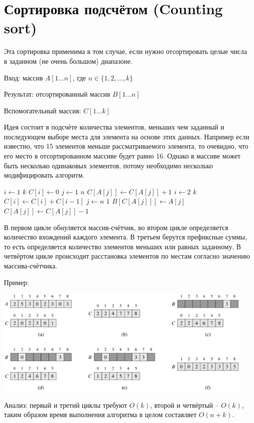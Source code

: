 \documentclass[a4paper,11pt]{article}
\begin{document}
\section{Сортировка подсчётом (Counting sort)}
Эта сортировка применима в том случае, если нужно отсортировать целые числа в
заданном (не очень большом) диапазоне.

Вход: массив $A[1 \ldots n]$, где $n \in \lbrace 1, 2, \ldots, k \rbrace$

Результат: отсортированный массив $B[1 \ldots n]$

Вспомогательный массив: $C[1 \ldots k]$

Идея состоит в подсчёте количества элементов, меньших чем заданный и последующем
выборе места для элемента на основе этих данных. Например если известно, что 15
элементов меньше рассматриваемого элемента, то очевидно, что его место в
отсортированном массиве будет равно 16. Однако в массиве может быть несколько
одинаковых элементов, потому необходимо несколько модифицировать алгоритм.

\begin{codebox}
\li \For $i \gets 1 $ \To $k$
\li      \Do $C[i] \gets 0$ \End
\li \For $j \gets 1 $ \To $n$
\li      \Do $C[A[j]] \gets C[A[j]] + 1$ \End
\li \For $i \gets 2 $ \To $k$
\li      \Do $C[i] \gets C[i] + C[i-1]$ \End
\li \For $j \gets n $ \Downto $1$
\li      \Do $B[C[A[j]]] \gets A[j]$
\li          $C[A[j]] \gets C[A[j]] - 1$
         \End
\end{codebox}

В первом цикле обнуляется массив-счётчик, во втором цикле определяется
количество вхождений каждого элемента. В третьем берутся префиксные суммы, то
есть определяется количество элементов меньших или равных заданному. В четвёртом
цикле происходит расстановка элементов по местам согласно значению массива-счётчика.

Пример:

\includegraphics[width=5in]{lecture5/counting-sort.eps}

Анализ: первый и третий циклы требуют $O(k)$, второй и четвёртый --
$O(k)$, таким образом время выполнения алгоритма в целом составляет
$O(n+k)$.
\end{document}
